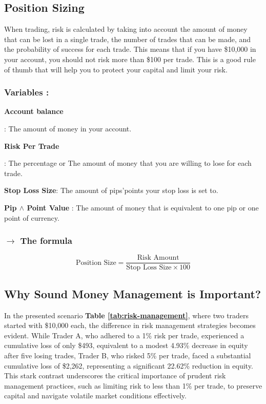 \documentclass[10pt]{article}           %
\begin{document}
\subsection{\small Position Sizing}
\small When trading, risk is calculated by taking into account the amount of money that can be lost in a single trade, the number of trades that can be made, and the probability of success for each trade.
\small This means that if you have \$10,000 in your account, you should not risk more than \$100 per trade. This is a good rule of thumb that will help you to protect your capital and limit your risk.

\subsubsection{Variables :}
\begin{itemize}
  \small{  \item \textbf{Account balance}} : The amount of money in your account.
  \small{  \item  \textbf{Risk Per Trade}} : The percentage or The amount of money that you are willing to lose for each trade. 
  \small{  \item  \textbf{Stop Loss Size}: The amount of pips'points your stop loss is set to.}
  \small{  \item  \textbf{Pip $\wedge$ Point Value} : The amount of money that is equivalent to one pip or one point of currency.}
\end{itemize}

\subsubsection{$\rightarrow$ The formula} %
\begin{equation*}
\text{Position Size} = \frac{\text{Risk Amount}}{\text{Stop Loss Size} \times 100}
\end{equation*}

\newpage


\subsection{\small Why Sound Money Management is Important?}

\indent \small In the presented scenario \textbf{Table \ref{tab:risk-management}}, where two traders started with \$10,000 each, the difference in risk management strategies becomes evident. While Trader A, who adhered to a 1\% risk per trade, experienced a cumulative loss of only \$493, equivalent to a modest 4.93\% decrease in equity after five losing trades, Trader B, who risked 5\% per trade, faced a substantial cumulative loss of \$2,262, representing a significant 22.62\% reduction in equity. This stark contrast underscores the critical importance of prudent risk management practices, such as limiting risk to less than 1\% per trade, to preserve capital and navigate volatile market conditions effectively.
\end{document}
